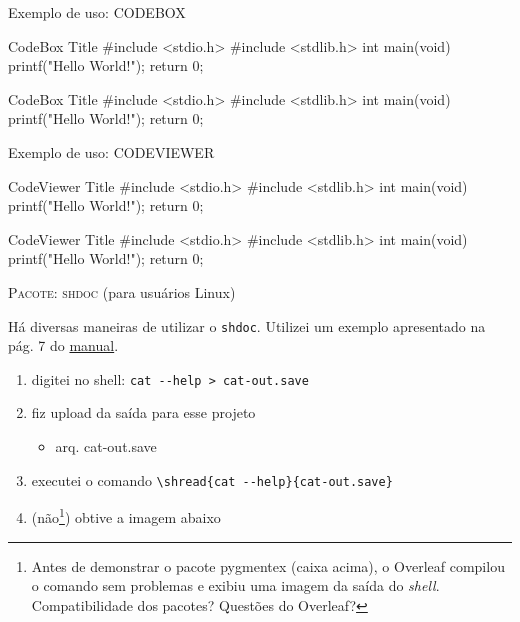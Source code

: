 \begin{codex}{Exemplo de uso: CODEBOX}
    \begin{codebox}{CodeBox Title}
    #include <stdio.h>
    #include <stdlib.h>
    int main(void)
    {
    printf("Hello World!\n");
    return 0;
    }
    \end{codebox}
\end{codex}

    \begin{codebox}{CodeBox Title}
    #include <stdio.h>
    #include <stdlib.h>
    int main(void)
    {
    printf("Hello World!\n");
    return 0;
    }
    \end{codebox}

\begin{codex}{Exemplo de uso: CODEVIEWER}
\begin{codeview}{CodeViewer Title}
#include <stdio.h>
#include <stdlib.h>
int main(void)
{
printf("Hello World!\n");
return 0;
}
\end{codeview}

\end{codex}
\begin{codeview}{CodeViewer Title}
#include <stdio.h>
#include <stdlib.h>
int main(void)
{
printf("Hello World!\n");
return 0;
}
\end{codeview}

\newpage
\textsc{Pacote: shdoc} (para usuários Linux)

Há diversas maneiras de utilizar o \verb|shdoc|. Utilizei um exemplo apresentado na pág. 7 do \href{https://linorg.usp.br/CTAN/macros/latex/contrib/shdoc/shdoc.pdf}{manual}.

\begin{enumerate}
    \item digitei no shell: \verb|cat --help > cat-out.save|
    \item fiz upload da saída para esse projeto
    \begin{itemize}
        \item arq. cat-out.save
    \end{itemize}
    \item executei o comando \verb|\shread{cat --help}{cat-out.save}|
    \item (não\footnote{Antes de demonstrar o pacote pygmentex (caixa acima), o Overleaf compilou o comando sem problemas e exibiu uma imagem da saída do \textit{shell}. Compatibilidade dos pacotes? Questões do Overleaf?}) obtive a imagem abaixo
\end{enumerate}

